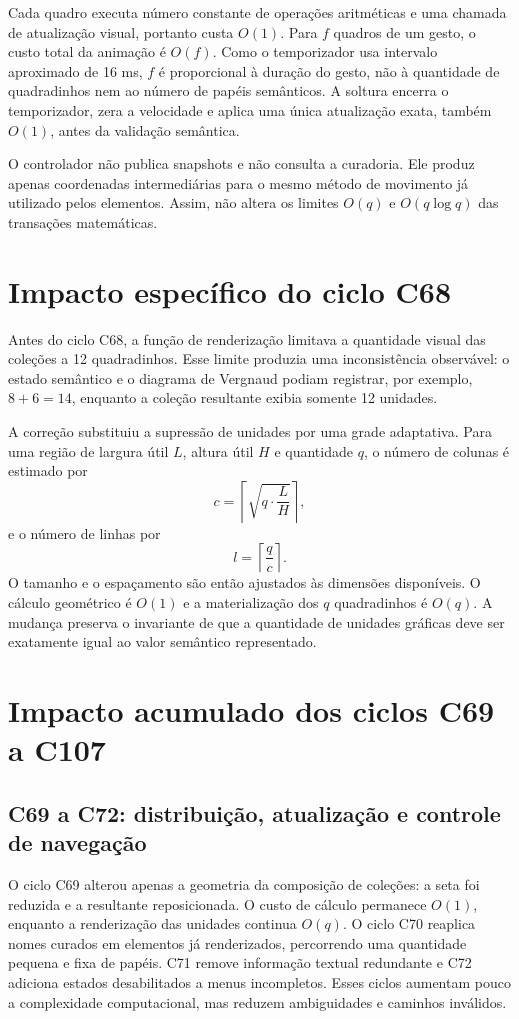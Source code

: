 \documentclass[12pt,a4paper]{article}
\begin{document}
Cada quadro executa número constante de operações aritméticas e uma chamada de atualização visual, portanto custa $O(1)$. Para $f$ quadros de um gesto, o custo total da animação é $O(f)$. Como o temporizador usa intervalo aproximado de 16 ms, $f$ é proporcional à duração do gesto, não à quantidade de quadradinhos nem ao número de papéis semânticos. A soltura encerra o temporizador, zera a velocidade e aplica uma única atualização exata, também $O(1)$, antes da validação semântica.

O controlador não publica snapshots e não consulta a curadoria. Ele produz apenas coordenadas intermediárias para o mesmo método de movimento já utilizado pelos elementos. Assim, não altera os limites $O(q)$ e $O(q\log q)$ das transações matemáticas.



\section{Impacto específico do ciclo C68}

Antes do ciclo C68, a função de renderização limitava a quantidade visual das coleções a 12 quadradinhos. Esse limite produzia uma inconsistência observável: o estado semântico e o diagrama de Vergnaud podiam registrar, por exemplo, $8+6=14$, enquanto a coleção resultante exibia somente 12 unidades.

A correção substituiu a supressão de unidades por uma grade adaptativa. Para uma região de largura útil $L$, altura útil $H$ e quantidade $q$, o número de colunas é estimado por
\[
c=\left\lceil\sqrt{q\cdot\frac{L}{H}}\right\rceil,
\]
e o número de linhas por
\[
l=\left\lceil\frac{q}{c}\right\rceil.
\]
O tamanho e o espaçamento são então ajustados às dimensões disponíveis. O cálculo geométrico é $O(1)$ e a materialização dos $q$ quadradinhos é $O(q)$. A mudança preserva o invariante de que a quantidade de unidades gráficas deve ser exatamente igual ao valor semântico representado.


\section{Impacto acumulado dos ciclos C69 a C107}

\subsection{C69 a C72: distribuição, atualização e controle de navegação}
O ciclo C69 alterou apenas a geometria da composição de coleções: a seta foi reduzida e a resultante reposicionada. O custo de cálculo permanece $O(1)$, enquanto a renderização das unidades continua $O(q)$. O ciclo C70 reaplica nomes curados em elementos já renderizados, percorrendo uma quantidade pequena e fixa de papéis. C71 remove informação textual redundante e C72 adiciona estados desabilitados a menus incompletos. Esses ciclos aumentam pouco a complexidade computacional, mas reduzem ambiguidades e caminhos inválidos.
\end{document}
